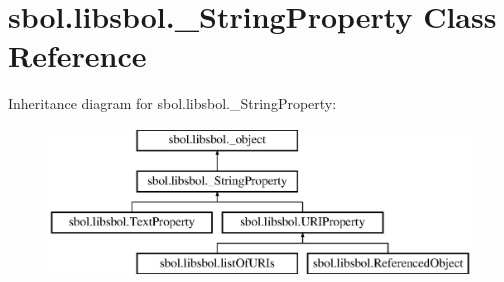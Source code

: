\hypertarget{classsbol_1_1libsbol_1_1___string_property}{}\section{sbol.\+libsbol.\+\_\+\+String\+Property Class Reference}
\label{classsbol_1_1libsbol_1_1___string_property}
Inheritance diagram for sbol.\+libsbol.\+\_\+\+String\+Property\+:\begin{figure}[H]
\begin{center}
\leavevmode
\includegraphics[height=3.929825cm]{classsbol_1_1libsbol_1_1___string_property}
\end{center}
\end{figure}
